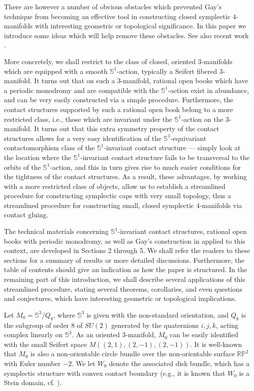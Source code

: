 \documentclass[11pt]{amsart}
\theoremstyle{plain}
\numberwithin{theorem}{section}
\theoremstyle{definition}
\newcommand{\R}{{\mathbb R}}
\renewcommand{\P}{{\mathbb P}}
\newcommand{\s}{{\mathbb S}}
\begin{document}
There are however a number of obvious obstacles which prevented Gay's technique from becoming an effective tool in constructing closed symplectic $4$-manifolds with interesting geometric or topological significance. In this paper we introduce some ideas which will help remove these obstacles. See also recent work \cite{EMPR}.

More concretely, we shall restrict to the class of closed, oriented $3$-manifolds which are equipped with a smooth $\s^1$-action, typically a Seifert fibered $3$-manifold. It turns out that on such a $3$-manifold, rational open books which have a periodic monodromy and are compatible with the $\s^1$-action exist in abundance, and can be very easily constructed via a simple procedure. Furthermore, the contact structures supported by such a rational open book belong to a more restricted class, i.e., those which are invariant under the $\s^1$-action on the $3$-manifold. It turns out that this extra symmetry property of the contact structures allows for a very easy identification of the $\s^1$-equivariant contactomorphism class of the $\s^1$-invariant contact structure --- simply look at the location where the $\s^1$-invariant contact structure fails to be transversal to the orbits of the 
$\s^1$-action, and this in turn gives rise to much easier conditions for the tightness of the contact structures. As a result, these advantages, by working with a more restricted class of objects, allow us to establish a streamlined procedure for constructing symplectic caps with very small topology, thus a streamlined procedure for constructing small, closed symplectic $4$-manifolds via contact gluing. 

The technical materials concerning $\s^1$-invariant contact structures, rational open books with
periodic monodromy, as well as Gay's construction in \cite{G} applied to this context, are developed in Sections 2 through 5. We shall refer the readers to these sections for a summary of results or more detailed discussions. 
Furthermore, the table of contents should give an indication as how the paper is structured. In the remaining part of this introduction, we shall describe several applications of this streamlined procedure, stating several theorems, corollaries, and even questions and conjectures, which have interesting geometric or topological implications. 

\vspace{3mm}

Let $M_0=\s^3/Q_8$, where $\s^3$ is given with the non-standard orientation, and $Q_8$ is the subgroup of order $8$ of $SU(2)$ generated by the quaternions $i,j,k$, acting complex linearly 
on $\s^3$. As an oriented $3$-manifold, $M_0$ can be easily identified with the small Seifert 
space $M((2,1),(2,-1), (2,-1))$. It is well-known that $M_0$ is also a non-orientable circle bundle 
over the non-orientable surface $\R\P^2$ with Euler number $-2$. We let $W_0$ denote the associated 
disk bundle, which has a symplectic structure with convex contact boundary 
(e.g., it is known that $W_0$ is a Stein domain, cf. \cite{Go}). 
\end{document}
